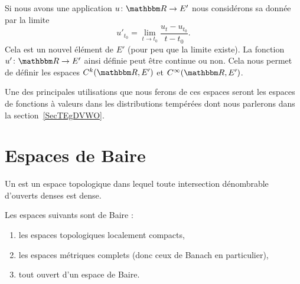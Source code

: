 \begin{definition}  \label{DefDZsypWu}
    Si nous avons une application \( u\colon \eR\to E'\) nous considérons sa  donnée par la limite
    \begin{equation}
        u'_{t_0}=\lim_{t\to t_0} \frac{ u_t-u_{t_0} }{ t-t_0 }.
    \end{equation}
    Cela est un nouvel élément de \( E'\) (pour peu que la limite existe). La fonction \( u'\colon \eR\to E'\) ainsi définie peut être continue ou non. Cela nous permet de définir les espaces \( C^k(\eR,E')\) et \( C^{\infty}(\eR,E')\).
\end{definition}
Une des principales utilisations que nous ferons de ces espaces seront les espaces de fonctions à valeurs dans les distributions tempérées dont nous parlerons dans la section~\ref{SecTEgDVWO}.

\section{Espaces de Baire}
\label{SecBDlaUrz}

\begin{definition}
    Un  est un espace topologique dans lequel toute intersection dénombrable d'ouverts denses est dense.
\end{definition}

\begin{theorem}    \label{ThoBBIljNM}
    Les espaces suivants sont de Baire :
    \begin{enumerate}
        \item
            les espaces topologiques localement compacts,
        \item
            les espaces métriques complets (donc ceux de Banach en particulier),
        \item
            tout ouvert d'un espace de Baire.
    \end{enumerate}
\end{theorem}

